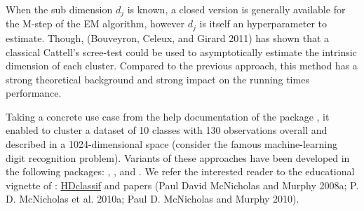 When the sub dimension \(d_j\) is known, a closed version is generally available for the M-step of the EM algorithm, however \(d_j\) is itself an hyperparameter to estimate. Though, (Bouveyron, Celeux, and Girard 2011) has shown that a classical Cattell's scree-test could be used to asymptotically estimate the intrinsic dimension of each cluster. Compared to the previous approach, this method has a strong theoretical background and strong impact on the running times performance.

Taking a concrete use case from the help documentation of the package , it enabled to cluster a dataset of 10 classes with 130 observations overall and described in a 1024-dimensional space (consider the famous machine-learning digit recognition problem). Variants of these approaches have been developed in the following packages: , ,  and . We refer the interested reader to the educational vignette of : \href{https://rdrr.io/pkg/HDclassif/man/HDclassif-package.html}{HDclassif} and papers (Paul David McNicholas and Murphy 2008a; P. D. McNicholas et al. 2010a; Paul D. McNicholas and Murphy 2010).

\color{green}

